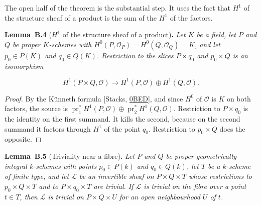 \documentclass[11pt]{article}
\newenvironment{bpstatement}[2]{\par\addvspace{0.6\baselineskip}\noindent\textbf{#1}#2\textbf{.}\enspace\ignorespaces}
  {\par\addvspace{0.4\baselineskip}}
\newenvironment{bpstatementit}[2]{\begin{bpstatement}{#1}{#2}\itshape\ignorespaces}{\end{bpstatement}}
\begin{document}
\label{bp11}%
The open half of the theorem is the substantial step. It uses the fact that \(H^1\) of the structure sheaf of a product is the sum of the \(H^1\) of the factors.

\label{bp12}%
\begin{bpstatementit}{Lemma~B.4}{ ($H^1$ of the structure sheaf of a product)}
Let \(K\) be a field, let \(P\) and \(Q\) be proper \(K\)-schemes with \(H^0(P,\mathcal O_P)=H^0(Q,\mathcal O_Q)=K\), and let \(p_0\in P(K)\) and \(q_0\in Q(K)\). Restriction to the slices \(P\times q_0\) and \(p_0\times Q\) is an isomorphism

\[
H^1(P\times Q,\mathcal O)\longrightarrow
H^1(P,\mathcal O)\oplus H^1(Q,\mathcal O).
\]
\end{bpstatementit}

\begin{proof}[{Proof}]\label{bp13}%
By the Künneth formula [Stacks, \href{https://stacks.math.columbia.edu/tag/0BED}{0BED}], and since \(H^0\) of \(\mathcal O\) is \(K\) on both factors, the source is \(\operatorname{pr}_1^*H^1(P,\mathcal O)\oplus
\operatorname{pr}_2^*H^1(Q,\mathcal O)\). Restriction to \(P\times q_0\) is the identity on the first summand. It kills the second, because on the second summand it factors through \(H^1\) of the point \(q_0\). Restriction to \(p_0\times Q\) does the opposite.
\end{proof}

\label{bp14}%
\begin{bpstatementit}{Lemma~B.5}{ (Triviality near a fibre)}
Let \(P\) and \(Q\) be proper geometrically integral \(k\)-schemes with points \(p_0\in P(k)\) and \(q_0\in Q(k)\), let \(T\) be a \(k\)-scheme of finite type, and let \(\mathcal L\) be an invertible sheaf on \(P\times Q\times T\) whose restrictions to \(p_0\times Q\times T\) and to \(P\times q_0\times T\) are trivial. If \(\mathcal L\) is trivial on the fibre over a point \(t\in T\), then \(\mathcal L\) is trivial on \(P\times Q\times U\) for an open neighbourhood \(U\) of \(t\).
\end{bpstatementit}
\end{document}
